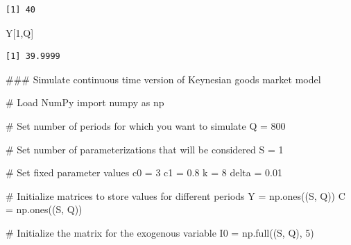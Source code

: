 \documentclass[
  letterpaper,
  DIV=11,
  numbers=noendperiod]{scrreprt}
\newenvironment{Shaded}{\begin{snugshade}}{\end{snugshade}}
\newcommand{\CommentTok}[1]{\textcolor[rgb]{0.37,0.37,0.37}{#1}}
\newcommand{\DecValTok}[1]{\textcolor[rgb]{0.68,0.00,0.00}{#1}}
\newcommand{\FloatTok}[1]{\textcolor[rgb]{0.68,0.00,0.00}{#1}}
\newcommand{\ImportTok}[1]{\textcolor[rgb]{0.00,0.46,0.62}{#1}}
\newcommand{\NormalTok}[1]{\textcolor[rgb]{0.00,0.23,0.31}{#1}}
\newcommand{\OperatorTok}[1]{\textcolor[rgb]{0.37,0.37,0.37}{#1}}
\begin{document}
\begin{verbatim}
[1] 40
\end{verbatim}

\begin{Shaded}
\begin{Highlighting}[]
\NormalTok{Y[}\DecValTok{1}\NormalTok{,Q]}
\end{Highlighting}
\end{Shaded}

\begin{verbatim}
[1] 39.9999
\end{verbatim}

\begin{tcolorbox}[enhanced jigsaw, titlerule=0mm, breakable, bottomrule=.15mm, toprule=.15mm, colbacktitle=quarto-callout-note-color!10!white, rightrule=.15mm, toptitle=1mm, opacityback=0, left=2mm, coltitle=black, title=\textcolor{quarto-callout-note-color}{\faInfo}\hspace{0.5em}{Python code}, colframe=quarto-callout-note-color-frame, opacitybacktitle=0.6, leftrule=.75mm, bottomtitle=1mm, arc=.35mm, colback=white]

\begin{Shaded}
\begin{Highlighting}[]
\CommentTok{\#\#\# Simulate continuous time version of Keynesian goods market model}

\CommentTok{\# Load NumPy}
\ImportTok{import}\NormalTok{ numpy }\ImportTok{as}\NormalTok{ np}

\CommentTok{\# Set number of periods for which you want to simulate}
\NormalTok{Q }\OperatorTok{=} \DecValTok{800}

\CommentTok{\# Set number of parameterizations that will be considered}
\NormalTok{S }\OperatorTok{=} \DecValTok{1}

\CommentTok{\# Set fixed parameter values}
\NormalTok{c0 }\OperatorTok{=} \DecValTok{3}
\NormalTok{c1 }\OperatorTok{=} \FloatTok{0.8}
\NormalTok{k }\OperatorTok{=} \DecValTok{8}
\NormalTok{delta }\OperatorTok{=} \FloatTok{0.01}

\CommentTok{\# Initialize matrices to store values for different periods}
\NormalTok{Y }\OperatorTok{=}\NormalTok{ np.ones((S, Q))}
\NormalTok{C }\OperatorTok{=}\NormalTok{ np.ones((S, Q))}

\CommentTok{\# Initialize the matrix for the exogenous variable}
\NormalTok{I0 }\OperatorTok{=}\NormalTok{ np.full((S, Q), }\DecValTok{5}\NormalTok{)}


\end{Highlighting}
\end{Shaded}
\end{tcolorbox}
\end{document}
